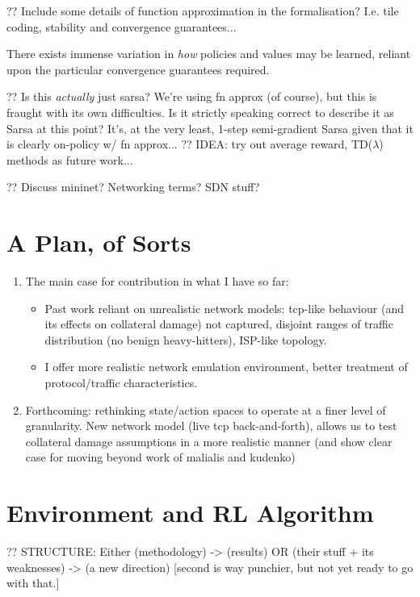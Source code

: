 \documentclass[conference, letterpaper, 10pt, times]{IEEEtran}
\begin{document}
?? Include some details of function approximation in the formalisation? I.e. tile coding, stability and convergence guarantees...

There exists immense variation in \emph{how} policies and values may be learned, reliant upon the particular convergence guarantees required.

?? Is this \emph{actually} just sarsa? We're using fn approx (of course), but this is fraught with its own difficulties. Is it strictly speaking correct to describe it as Sarsa at this point? It's, at the very least, 1-step semi-gradient Sarsa given that it is clearly on-policy w/ fn approx...
?? IDEA: try out average reward, TD($\lambda$) methods as future work...

?? Discuss mininet? Networking terms? SDN stuff?

\section{A Plan, of Sorts}

\begin{enumerate}
	\item The main case for contribution in what I have so far:
	\begin{itemize}
		\item Past work reliant on unrealistic network models: tcp-like behaviour (and its effects on collateral damage) not captured, disjoint ranges of traffic distribution (no benign heavy-hitters), ISP-like topology.
		\item I offer more realistic network emulation environment, better treatment of protocol/traffic characteristics.
	\end{itemize}
	\item Forthcoming: rethinking state/action spaces to operate at a finer level of granularity. New network model (live tcp back-and-forth), allows us to test collateral damage assumptions in a more realistic manner (and show clear case for moving beyond work of malialis and kudenko)
\end{enumerate}

\section{Environment and RL Algorithm}

?? STRUCTURE: Either (methodology) -> (results) OR (their stuff + its weaknesses) -> (a new direction) [second is way punchier, but not yet ready to go with that.]
\end{document}
